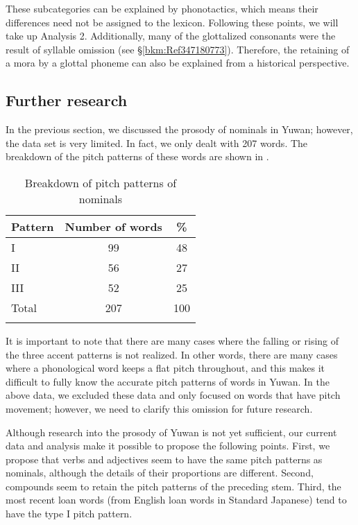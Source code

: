 These subcategories can be explained by phonotactics, which means their differences need not be assigned to the lexicon. Following these points, we will take up Analysis 2. Additionally, many of the glottalized consonants were the result of syllable omission (see §\ref{bkm:Ref347180773}). Therefore, the retaining of a mora by a glottal phoneme can also be explained from a historical perspective.

\subsection{Further research}
\label{bkm:Ref347175621}\hypertarget{RefHeadingToc395696986}{}\label{bkm:Ref381418627}
In the previous section, we discussed the prosody of nominals in Yuwan; however, the data set is very limited. In fact, we only dealt with 207 words. The breakdown of the pitch patterns of these words are shown in .

\begin{table}
\caption{Breakdown of pitch patterns of nominals\label{tab:2:33}}
\begin{tabular}{lS[table-format=3]S[table-format=2]}
\lsptoprule
Pattern & {Number of words} & {\%}\\\midrule
I     & 99  & 48\\
II    & 56  & 27\\
III   & 52  & 25\\\midrule
Total & 207 & 100\\
\lspbottomrule
\end{tabular}
\end{table}

It is important to note that there are many cases where the falling or rising of the three accent patterns is not realized. In other words, there are many cases where a phonological word keeps a flat pitch throughout, and this makes it difficult to fully know the accurate pitch patterns of words in Yuwan. In the above data, we excluded these data and only focused on words that have pitch movement; however, we need to clarify this omission for future research.

Although research into the prosody of Yuwan is not yet sufficient, our current data and analysis make it possible to propose the following points. First, we propose that verbs and adjectives seem to have the same pitch patterns as nominals, although the details of their proportions are different. Second, compounds seem to retain the pitch patterns of the preceding stem. Third, the most recent loan words (from English loan words in Standard Japanese) tend to have the type I pitch pattern.
